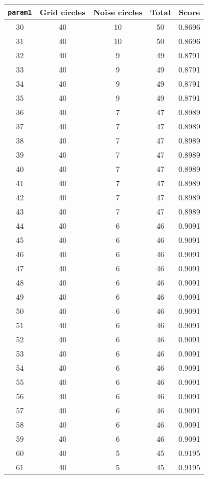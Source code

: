 \documentclass[letterpaper, 12pt]{article}
\begin{document}
\begin{longtable}{|c|c|c|c|c|}
\hline
\textbf{\texttt{param1}} & \textbf{Grid circles} & \textbf{Noise circles} & \textbf{Total} & \textbf{Score} \\
\hline
30 & 40 & 10 & 50 & 0.8696 \\
\hline
31 & 40 & 10 & 50 & 0.8696 \\
\hline
32 & 40 & 9 & 49 & 0.8791 \\
\hline
33 & 40 & 9 & 49 & 0.8791 \\
\hline
34 & 40 & 9 & 49 & 0.8791 \\
\hline
35 & 40 & 9 & 49 & 0.8791 \\
\hline
36 & 40 & 7 & 47 & 0.8989 \\
\hline
37 & 40 & 7 & 47 & 0.8989 \\
\hline
38 & 40 & 7 & 47 & 0.8989 \\
\hline
39 & 40 & 7 & 47 & 0.8989 \\
\hline
40 & 40 & 7 & 47 & 0.8989 \\
\hline
41 & 40 & 7 & 47 & 0.8989 \\
\hline
42 & 40 & 7 & 47 & 0.8989 \\
\hline
43 & 40 & 7 & 47 & 0.8989 \\
\hline
44 & 40 & 6 & 46 & 0.9091 \\
\hline
45 & 40 & 6 & 46 & 0.9091 \\
\hline
46 & 40 & 6 & 46 & 0.9091 \\
\hline
47 & 40 & 6 & 46 & 0.9091 \\
\hline
48 & 40 & 6 & 46 & 0.9091 \\
\hline
49 & 40 & 6 & 46 & 0.9091 \\
\hline
50 & 40 & 6 & 46 & 0.9091 \\
\hline
51 & 40 & 6 & 46 & 0.9091 \\
\hline
52 & 40 & 6 & 46 & 0.9091 \\
\hline
53 & 40 & 6 & 46 & 0.9091 \\
\hline
54 & 40 & 6 & 46 & 0.9091 \\
\hline
55 & 40 & 6 & 46 & 0.9091 \\
\hline
56 & 40 & 6 & 46 & 0.9091 \\
\hline
57 & 40 & 6 & 46 & 0.9091 \\
\hline
58 & 40 & 6 & 46 & 0.9091 \\
\hline
59 & 40 & 6 & 46 & 0.9091 \\
\hline
60 & 40 & 5 & 45 & 0.9195 \\
\hline
61 & 40 & 5 & 45 & 0.9195 \\

\end{longtable}
\end{document}
